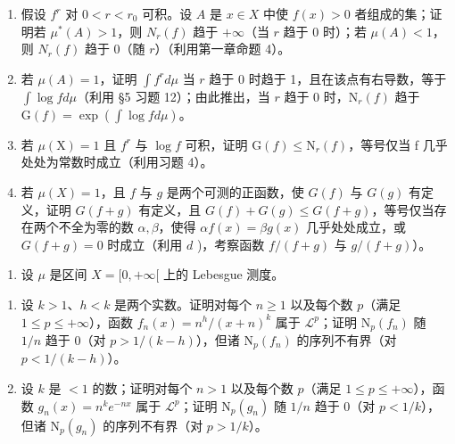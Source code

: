 \begin{enumerate}
\def\labelenumi{\alph{enumi})}
\setcounter{enumi}{1}
\item
  假设 \(f^r\) 对 \(0 < r < r_0\) 可积。设 \(A\) 是 \(x \in X\) 中使 \(f(x) > 0\) 者组成的集；证明若 \(\mu^*(A) > 1\)，则 \(N_r(f)\) 趋于 \(+\infty\)（当 \(r\) 趋于 \(0\) 时）；若 \(\mu(A) < 1\)，则 \(N_r(f)\) 趋于 \(0\)（随 \(r\)）（利用第一章命题 4）。
\item
  若 \(\mu(A) = 1\)，证明 \(\int f^r d\mu\) 当 \(r\) 趋于 0 时趋于 1，且在该点有右导数，等于 \(\int \log f d\mu\)（利用 §5 习题 12）；由此推出，当 \(r\) 趋于 0 时，\(\mathrm{N}_r(f)\) 趋于 \(\mathrm{G}(f) = \exp(\int \log f d\mu)\)。
\item
  若 \(\mu(\mathrm{X})=1\) 且 \(f^{r}\) 与 \(\log f\) 可积，证明 \(\mathrm{G}(f)\leqslant\mathrm{N}_{r}(f)\)，等号仅当 f 几乎处处为常数时成立（利用习题 4）。
\item
  若 \(\mu(X) = 1\)，且 \(f\) 与 \(g\) 是两个可测的正函数，使 \(G(f)\) 与 \(G(g)\) 有定义，证明 \(G(f + g)\) 有定义，且 \(G(f) + G(g) \leqslant G(f + g)\)，等号仅当存在两个不全为零的数 \(\alpha, \beta\)，使得 \(\alpha f(x) = \beta g(x)\) 几乎处处成立，或 \(G(f + g) = 0\) 时成立（利用 \(d\) )，考察函数 \(f/(f + g)\) 与 \(g/(f + g)\)）。
\end{enumerate}

\begin{enumerate}
\def\labelenumi{\arabic{enumi})}
\setcounter{enumi}{7}
\tightlist
\item
  设 \(\mu\) 是区间 \(X = [0, +\infty[\) 上的 Lebesgue 测度。
\end{enumerate}

\begin{enumerate}
\def\labelenumi{\alph{enumi})}
\item
  设 \(k > 1\)、\(h < k\) 是两个实数。证明对每个 \(n \geqslant 1\) 以及每个数 \(p\)（满足 \(1 \leqslant p \leqslant +\infty\)），函数 \(f_n(x) = n^h / (x + n)^k\) 属于 \(\mathcal{L}^p\)；证明 \(\mathrm{N}_p(f_n)\) 随 \(1/n\) 趋于 0（对 \(p > 1 / (k - h)\)），但诸 \(\mathrm{N}_p(f_n)\) 的序列不有界（对 \(p < 1 / (k - h)\)）。
\item
  设 \(k\) 是 \(< 1\) 的数；证明对每个 \(n > 1\) 以及每个数 \(p\)（满足 \(1 \leqslant p \leqslant +\infty\)），函数 \(g_n(x) = n^k e^{-nx}\) 属于 \(\mathcal{L}^p\)；证明 \(\mathrm{N}_p(g_n)\) 随 \(1/n\) 趋于 0（对 \(p < 1/k\)），但诸 \(\mathrm{N}_p(g_n)\) 的序列不有界（对 \(p > 1/k\)）。
\end{enumerate}

